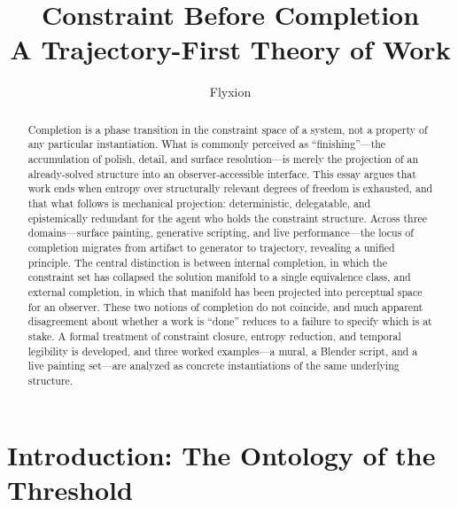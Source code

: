 \documentclass[12pt, twoside]{article}
\title{%
  \vspace{-0.5in}
  {\Large Constraint Before Completion}\\[0.4em]
  {\normalsize A Trajectory-First Theory of Work}
}
\author{Flyxion}
\date{}
\theoremstyle{plain}
\theoremstyle{definition}
\theoremstyle{remark}
\begin{document}

\maketitle
\thispagestyle{empty}

\vspace{1em}

\begin{abstract}
\noindent
Completion is a phase transition in the constraint space of a system, not a property of any particular instantiation. What is commonly perceived as ``finishing''---the accumulation of polish, detail, and surface resolution---is merely the projection of an already-solved structure into an observer-accessible interface. This essay argues that work ends when entropy over structurally relevant degrees of freedom is exhausted, and that what follows is mechanical projection: deterministic, delegatable, and epistemically redundant for the agent who holds the constraint structure. Across three domains---surface painting, generative scripting, and live performance---the locus of completion migrates from artifact to generator to trajectory, revealing a unified principle. The central distinction is between internal completion, in which the constraint set has collapsed the solution manifold to a single equivalence class, and external completion, in which that manifold has been projected into perceptual space for an observer. These two notions of completion do not coincide, and much apparent disagreement about whether a work is ``done'' reduces to a failure to specify which is at stake. A formal treatment of constraint closure, entropy reduction, and temporal legibility is developed, and three worked examples---a mural, a Blender script, and a live painting set---are analyzed as concrete instantiations of the same underlying structure.
\end{abstract}

\vspace{1.5em}
\tableofcontents
\newpage

\section{Introduction: The Ontology of the Threshold}
\end{document}
